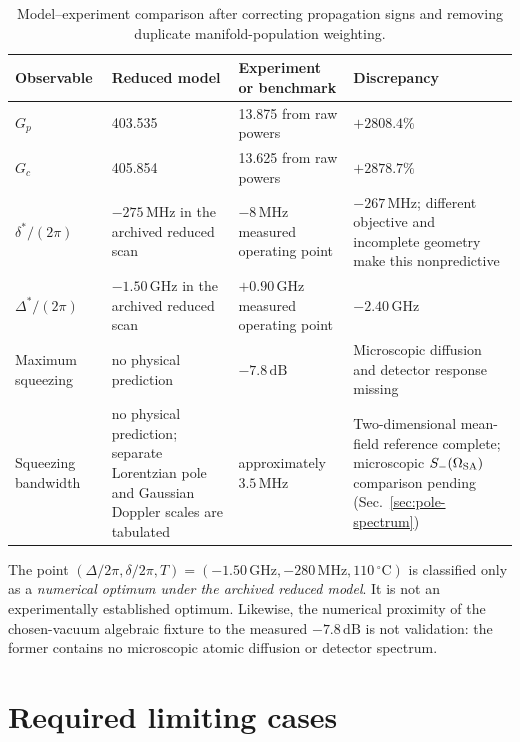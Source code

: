 \documentclass[11pt,a4paper]{article}
\newcommand{\GHz}{\,\mathrm{GHz}}
\newcommand{\MHz}{\,\mathrm{MHz}}
\newcommand{\dB}{\,\mathrm{dB}}
\newcommand{\degC}{\,^{\circ}\mathrm C}
\begin{document}
\begin{table}[ht]
\centering
\caption{Model--experiment comparison after correcting propagation signs and
removing duplicate manifold-population weighting.}
\label{tab:discrepancies}
\small
\begin{tabularx}{\textwidth}{L{3.0cm}L{3.5cm}L{3.2cm}Y}
\toprule
Observable & Reduced model & Experiment or benchmark & Discrepancy\\
\midrule
$G_p$ & 403.535 & 13.875 from raw powers & $+2808.4\%$\\
$G_c$ & 405.854 & 13.625 from raw powers & $+2878.7\%$\\
$\delta^*/(2\pi)$ & $-275\MHz$ in the archived reduced scan &
$-8\MHz$ measured operating point & $-267\MHz$; different objective and
incomplete geometry make this nonpredictive\\
$\Delta^*/(2\pi)$ & $-1.50\GHz$ in the archived reduced scan &
$+0.90\GHz$ measured operating point & $-2.40\GHz$\\
Maximum squeezing & no physical prediction & $-7.8\dB$ &
Microscopic diffusion and detector response missing\\
Squeezing bandwidth & no physical prediction; separate Lorentzian pole and
Gaussian Doppler scales are tabulated & approximately $3.5\MHz$ &
Two-dimensional mean-field reference complete; microscopic
$S_-(\Omega_{\rm SA})$ comparison pending (Sec.~\ref{sec:pole-spectrum})\\
\bottomrule
\end{tabularx}
\end{table}

The point
$(\Delta/2\pi,\delta/2\pi,T)=(-1.50\GHz,-280\MHz,110\degC)$ is classified
only as a \emph{numerical optimum under the archived reduced model}. It is
not an experimentally established optimum. Likewise, the numerical proximity
of the chosen-vacuum algebraic fixture to the measured $-7.8\dB$ is not
validation: the former contains no microscopic atomic diffusion or detector
spectrum.

\section{Required limiting cases}
\end{document}
